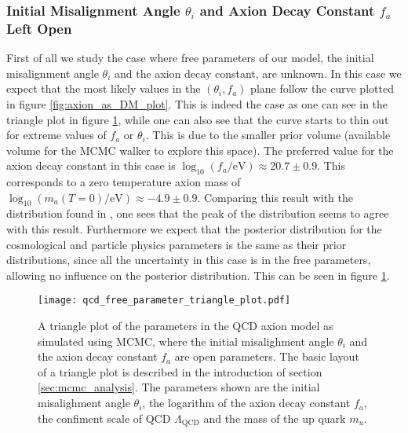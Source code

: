 \documentclass[twoside,a4paper, 12pt]{article}
\numberwithin{equation}{section}
\begin{document}
\subsubsection{Initial Misalignment Angle $\theta_i$ and Axion Decay Constant $f_a$ Left Open}
First of all we study the case where free parameters of our model, the initial misalignment angle $\theta_i$ and the axion decay constant, are unknown.
In this case we expect that the most likely values in the $(\theta_i, f_a)$ plane follow
the curve plotted in figure \ref{fig:axion_as_DM_plot}.
This is indeed the case as one can see in the triangle plot in figure \ref{fig:qcd_free_parameter_triangle_plot},
while one can also see that the curve starts to thin out for extreme values of $f_a$ or $\theta_i$.
This is due to the smaller prior volume (available volume for the MCMC walker to explore this space).
The preferred value for the axion decay constant in this case is $\log_{10} \left( f_a / \mathrm{eV} \right) \approx 20.7 \pm 0.9$.
This corresponds to a zero temperature axion mass of  $\log_{10} (m_a(T=0) / \mathrm{eV})  \approx -4.9 \pm 0.9$. 
Comparing this result with the distribution found in \cite[Fig. 17]{GambitAxionHoof}, one
sees that the peak of the distribution seems to agree with this result.
Furthermore we expect that the posterior distribution for the cosmological and particle physics
parameters is the same as their prior distributions, since all the uncertainty in this case is in
the free parameters, allowing no influence on the posterior distribution. This can be seen in
figure \ref{fig:qcd_free_parameter_triangle_plot}.
\begin{figure}[H]
    \centering
    \texttt{[image: qcd\_free\_parameter\_triangle\_plot.pdf]}
    \caption{A triangle plot of the parameters in the QCD axion model as simulated using MCMC, where the initial misalighment angle $\theta_i$ and the axion decay constant
    $f_a$ are open parameters.
    The basic layout of a triangle plot is described in the introduction of section \ref{sec:mcmc_analysis}.
    The parameters shown are the initial misalighment angle $\theta_i$, the logarithm
    of the axion decay constant $f_a$, the confiment scale of QCD $\Lambda_\mathrm{QCD}$
    and the mass of the up quark $m_u$.
    }
    \label{fig:qcd_free_parameter_triangle_plot}
\end{figure}
\end{document}
